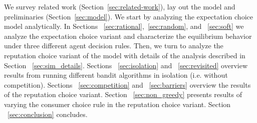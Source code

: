 We survey related work (Section~\ref{sec:related-work}), lay out the model and preliminaries (Section~\ref{sec:model}). We start by analyzing the expectation choice model analytically. In Sections ~\ref{sec:rational},~\ref{sec:random}, and ~\ref{sec:soft} we analyze the expectation choice variant and characterize the equilibrium behavior under three different agent decision rules. Then, we turn to analyze the reputation choice variant of the model with details of the analysis described in Section ~\ref{sec:sim_details}. Sections ~\ref{sec:isolation} and ~\ref{sec:revisited} overview results from running different bandit algorithms in isolation (i.e. without competition). Sections ~\ref{sec:competition} and ~\ref{sec:barriers} overview the results of the reputation choice variant. Section ~\ref{sec:non_greedy} presents results of varying the consumer choice rule in the reputation choice variant. Section ~\ref{sec:conclusion} concludes.


